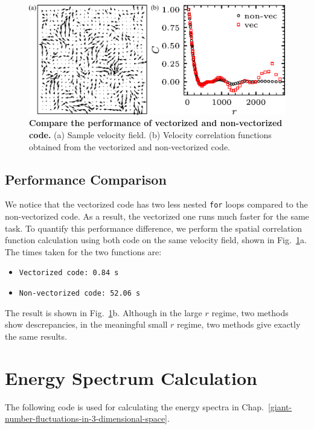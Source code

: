 \begin{figure}[!ht]
	\begin{center}
	\includegraphics[width=5.5in]{Figs/A-2/vectorization.pdf}
	\end{center}
	\caption[Compare the performance of vectorized and non-vectorized code]
	{
	\textbf{Compare the performance of vectorized and non-vectorized code.}
  (a) Sample velocity field.
  (b) Velocity correlation functions obtained from the vectorized and non-vectorized code.
	}
	\label{fig:vectorization-performance}
\end{figure}


\subsection{Performance Comparison}
We notice that the vectorized code has two less nested \texttt{for} loops compared to the non-vectorized code. As a result, the vectorized one runs much faster for the same task. To quantify this performance difference, we perform the spatial correlation function calculation using both code on the same velocity field, shown in Fig.~\ref{fig:vectorization-performance}a. The times taken for the two functions are:
\begin{itemize}
  \item \texttt{Vectorized code: 0.84 s}
  \item \texttt{Non-vectorized code: 52.06 s}
\end{itemize}
The result is shown in Fig.~\ref{fig:vectorization-performance}b. Although in the large $r$ regime, two methods show descrepancies, in the meaningful small $r$ regime, two methods give exactly the same results.


\section{Energy Spectrum Calculation}
The following code is used for calculating the energy spectra in Chap.~\ref{giant-number-fluctuations-in-3-dimensional-space}.

